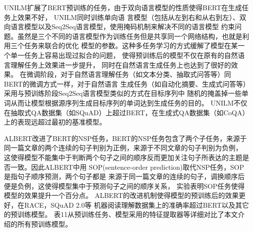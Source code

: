 UNILM扩展了BERT预训练的任务，由于双向语言模型的性质使得BERT在生成任务上效果不好，
UNILM同时训练单向语
言模型（包括从左到右和从右到左）、双向语言模型以及Seq2Seq语言模型，使用掩码机制来解决不同的语言模型
约束问题。虽然是三个不同的语言模型作为训练任务但是共享同一个网络结构，也就是利用三个任务来联合的优化
模型的参数。这种多任务学习的方式缓解了模型在某一个单一任务上容易出现过拟合的问题，
使得预训练后的模型不仅在原有的自然语言理解任务上效果进一步提升，
同时在自然语言生成任务上也达到了很好的效果。
在微调阶段，对于自然语言理解任务（如文本分类、抽取式问答等）同BERT的微调方式一样，对于自然语言
生成任务（如自动化摘要、生成式问答等）采用与预训练阶段Seq2Seq语言模型类似的方式在目标序列中
随机的掩盖掉一些单词从而让模型根据源序列生成目标序列的单词达到生成任务的目的。
UNILM不仅在抽取式QA数据集（如SQuAD）上超过BERT，在生成式QA数据集（如CoQA）上的表现远超过最初的基准模型。




ALBERT改进了BERT的NSP任务，BERT的NSP任务包含了两个子任务，来源于同一篇文章的两个连续的句子判别为正例，来源于不同文章的句子判别为负例，
这使得模型不能集中于判断两个句子之间的顺序反而更加关注句子所表达的主题是否一致。因此ALBERT中用
SOP(sentence-order prediction)取代NSP任务，SOP是指句子顺序预测，两个句子都是
来源于同一篇文章的连续的句子，调换顺序后便是负例，这使得模型集中于预测句子之间的顺序关系，
实验表明SOP任务使得模型的效果提升一个百分点。
ALBERT的改进机制使得模型的预训练后的效果更好，在RACE，SQuAD 2.0等
机器阅读理解数据集上的准确率超过BERT以及其它的预训练模型。
表11从预训练任务、模型采用的特征提取器等详细对比了本文介绍的所有预训练模型。

